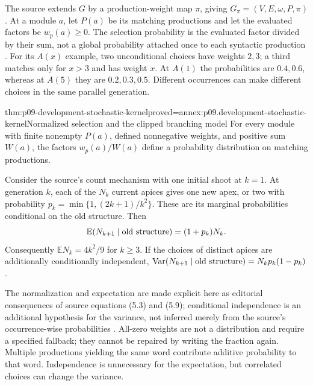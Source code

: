 The source extends \(G\) by a production-weight map \(\pi\), giving
\(G_\pi=(V,E,\omega,P,\pi)\). At a module \(a\), let \(P(a)\) be its
matching productions and let the evaluated factors be \(w_p(a)\geq0\).
The selection probability is the evaluated factor divided by their sum,
not a global probability attached once to each syntactic production
\cite[pp.~554--555]{PrusinkiewiczEtAl1997DevelopmentIntake}.
For its \(A(x)\) example, two unconditional choices have weights \(2,3\);
a third matches only for \(x>3\) and has weight \(x\).
At \(A(1)\) the probabilities are \(0.4,0.6\), whereas at \(A(5)\)
they are \(0.2,0.3,0.5\). Different occurrences can make different choices
in the same parallel generation.

\begin{hbtheorem}{thm:p09-development-stochastic-kernel}{proved=annex:p09.development-stochastic-kernel}{Normalized selection and the clipped branching model}
For every module with finite nonempty \(P(a)\), defined nonnegative weights,
and positive sum \(W(a)\), the factors \(w_p(a)/W(a)\) define a probability
distribution on matching productions.

Consider the source's count mechanism with one initial shoot at \(k=1\).
At generation \(k\), each of the \(N_k\) current apices gives one new apex,
or two with probability
\(p_k=\min\{1,(2k+1)/k^2\}\). These are its marginal probabilities
conditional on the old structure. Then
\[
 \mathbb E(N_{k+1}\mid\hbox{old structure})=(1+p_k)N_k.
\]
Consequently \(\mathbb E N_k=4k^2/9\) for \(k\geq3\).
If the choices of distinct apices are additionally conditionally independent,
\(\operatorname{Var}(N_{k+1}\mid\hbox{old structure})
=N_kp_k(1-p_k)\).
\end{hbtheorem}

The normalization and expectation are made explicit here as editorial
consequences of source equations (5.3) and (5.9); conditional independence
is an additional hypothesis for the variance, not inferred merely from
the source's occurrence-wise probabilities
\cite[pp.~555--558]{PrusinkiewiczEtAl1997DevelopmentIntake}.
All-zero weights are not a distribution and require a specified fallback;
they cannot be repaired by writing the fraction again.
Multiple productions yielding the same word contribute additive probability
to that word. Independence is unnecessary for the expectation, but correlated
choices can change the variance.

